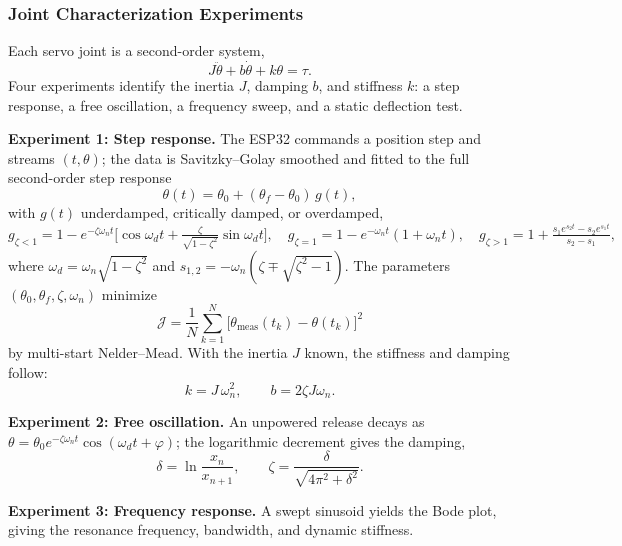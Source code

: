 \subsubsection{Joint Characterization Experiments}\label{sec:jointid}
Each servo joint is a second-order system,
\begin{equation}\label{eq:jointmodel}
J\ddot\theta+b\dot\theta+k\theta=\tau.
\end{equation}
Four experiments identify the inertia $J$, damping $b$, and stiffness $k$: a step response, a free oscillation, a frequency sweep, and a static deflection test.

\textbf{Experiment 1: Step response.} The ESP32 commands a position step and streams $(t,\theta)$; the data is Savitzky--Golay smoothed and fitted to the full second-order step response
\begin{equation}\label{eq:stepform}
\theta(t)=\theta_0+(\theta_f-\theta_0)\,g(t),
\end{equation}
with $g(t)$ underdamped, critically damped, or overdamped,
\begin{equation}\label{eq:gforms}
g_{\zeta<1}=1-e^{-\zeta\omega_n t}\!\Big[\cos\omega_d t+\tfrac{\zeta}{\sqrt{1-\zeta^2}}\sin\omega_d t\Big],\quad
g_{\zeta=1}=1-e^{-\omega_n t}(1+\omega_n t),\quad
g_{\zeta>1}=1+\tfrac{s_1e^{s_2t}-s_2e^{s_1t}}{s_2-s_1},
\end{equation}
where $\omega_d=\omega_n\sqrt{1-\zeta^2}$ and $s_{1,2}=-\omega_n(\zeta\mp\sqrt{\zeta^2-1})$. The parameters $(\theta_0,\theta_f,\zeta,\omega_n)$ minimize
\begin{equation}\label{eq:lscost}
\mathcal{J}=\frac{1}{N}\sum_{k=1}^{N}\big[\theta_{\text{meas}}(t_k)-\theta(t_k)\big]^2
\end{equation}
by multi-start Nelder--Mead. With the inertia $J$ known, the stiffness and damping follow:
\begin{equation}\label{eq:kb}
k=J\,\omega_n^2,\qquad b=2\zeta J\omega_n.
\end{equation}

\textbf{Experiment 2: Free oscillation.} An unpowered release decays as $\theta=\theta_0e^{-\zeta\omega_n t}\cos(\omega_d t+\varphi)$; the logarithmic decrement gives the damping,
\begin{equation}\label{eq:logdec}
\delta=\ln\frac{x_n}{x_{n+1}},\qquad \zeta=\frac{\delta}{\sqrt{4\pi^2+\delta^2}}.
\end{equation}

\textbf{Experiment 3: Frequency response.} A swept sinusoid yields the Bode plot, giving the resonance frequency, bandwidth, and dynamic stiffness.

